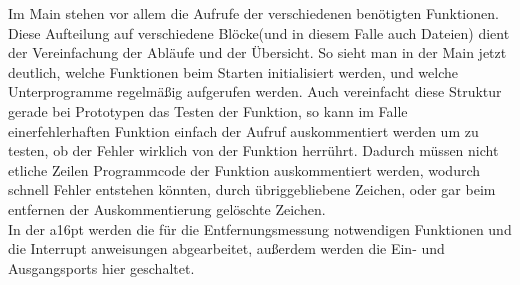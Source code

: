 Im Main stehen vor allem die Aufrufe der verschiedenen benötigten Funktionen. Diese Aufteilung auf verschiedene Blöcke(und in diesem Falle auch Dateien) dient der Vereinfachung der Abläufe und der Übersicht. So sieht man in der Main jetzt deutlich, welche Funktionen beim Starten initialisiert werden, und welche Unterprogramme regelmäßig aufgerufen werden. Auch vereinfacht diese Struktur gerade bei Prototypen das Testen der Funktion, so kann im Falle einerfehlerhaften Funktion einfach der Aufruf auskommentiert werden um zu testen, ob der Fehler wirklich von der Funktion herrührt. Dadurch müssen nicht etliche Zeilen Programmcode der Funktion auskommentiert werden, wodurch schnell Fehler entstehen könnten, durch übriggebliebene Zeichen, oder gar beim entfernen der Auskommentierung gelöschte Zeichen.\\%
In der a16pt werden die für die Entfernungsmessung notwendigen Funktionen und die Interrupt anweisungen abgearbeitet, außerdem werden die Ein- und Ausgangsports hier geschaltet.\\
